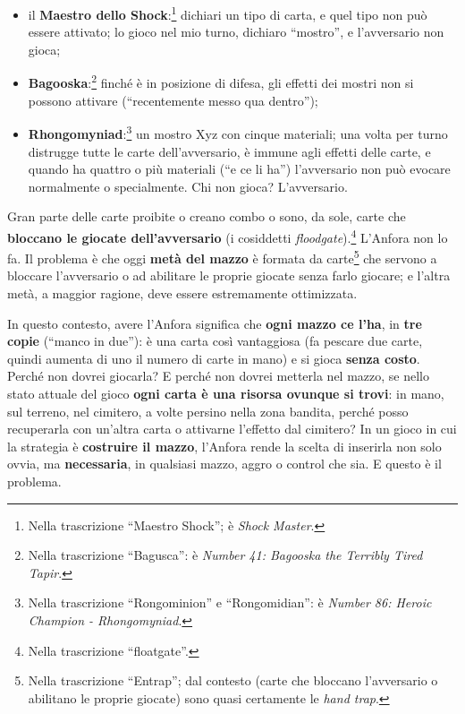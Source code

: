 \begin{itemize}
  \item il \textbf{Maestro dello Shock}:\footnote{Nella trascrizione
        ``Maestro Shock''; è \emph{Shock Master}.} dichiari un tipo di carta,
        e quel tipo non può essere attivato; lo gioco nel mio turno, dichiaro
        ``mostro'', e l'avversario non gioca;
  \item \textbf{Bagooska}:\footnote{Nella trascrizione ``Bagusca'': è
        \emph{Number 41: Bagooska the Terribly Tired Tapir}.} finché è in
        posizione di difesa, gli effetti dei mostri non si possono attivare
        (``recentemente messo qua dentro'');
  \item \textbf{Rhongomyniad}:\footnote{Nella trascrizione ``Rongominion'' e
        ``Rongomidian'': è \emph{Number 86: Heroic Champion -
        Rhongomyniad}.} un mostro Xyz con cinque materiali; una volta per
        turno distrugge tutte le carte dell'avversario, è immune agli effetti
        delle carte, e quando ha quattro o più materiali (``e ce li ha'')
        l'avversario non può evocare normalmente o specialmente. Chi non
        gioca? L'avversario.
\end{itemize}
Gran parte delle carte proibite o creano combo o sono, da sole, carte che
\textbf{bloccano le giocate dell'avversario} (i cosiddetti
\emph{floodgate}).\footnote{Nella trascrizione ``floatgate''.} L'Anfora non
lo fa. Il problema è che oggi \textbf{metà del mazzo} è formata da
carte\footnote{Nella trascrizione ``Entrap''; dal contesto (carte che
bloccano l'avversario o abilitano le proprie giocate) sono quasi certamente
le \emph{hand trap}.} che servono a bloccare l'avversario o ad abilitare le
proprie giocate senza farlo giocare; e l'altra metà, a maggior ragione, deve
essere estremamente ottimizzata.

In questo contesto, avere l'Anfora significa che \textbf{ogni mazzo ce l'ha},
in \textbf{tre copie} (``manco in due''): è una carta così vantaggiosa (fa
pescare due carte, quindi aumenta di uno il numero di carte in mano) e si
gioca \textbf{senza costo}. Perché non dovrei giocarla? E perché non dovrei
metterla nel mazzo, se nello stato attuale del gioco \textbf{ogni carta è una
risorsa ovunque si trovi}: in mano, sul terreno, nel cimitero, a volte
persino nella zona bandita, perché posso recuperarla con un'altra carta o
attivarne l'effetto dal cimitero? In un gioco in cui la strategia è
\textbf{costruire il mazzo}, l'Anfora rende la scelta di inserirla non solo
ovvia, ma \textbf{necessaria}, in qualsiasi mazzo, aggro o control che sia.
E questo è il problema.

